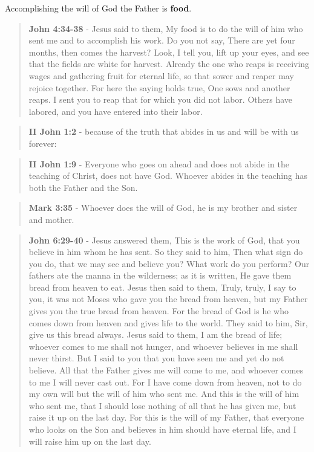 \documentclass[11pt]{article}
\begin{document}
Accomplishing the will of God the Father is \textbf{food}.

\begin{quote}
\textbf{John 4:34-38} - Jesus said to them, My food is to do the will of him who sent me and to accomplish his work. Do you not say, There are yet four months, then comes the harvest? Look, I tell you, lift up your eyes, and see that the fields are white for harvest. Already the one who reaps is receiving wages and gathering fruit for eternal life, so that sower and reaper may rejoice together. For here the saying holds true, One sows and another reaps. I sent you to reap that for which you did not labor. Others have labored, and you have entered into their labor.
\end{quote}

\begin{quote}
\textbf{II John 1:2} - because of the truth that abides in us and will be with us forever:
\end{quote}

\begin{quote}
\textbf{II John 1:9} - Everyone who goes on ahead and does not abide in the teaching of Christ, does not have God. Whoever abides in the teaching has both the Father and the Son.
\end{quote}

\begin{quote}
\textbf{Mark 3:35} - Whoever does the will of God, he is my brother and sister and mother.
\end{quote}

\begin{quote}
\textbf{John 6:29-40} - Jesus answered them, This is the work of God, that you believe in him whom he has sent. So they said to him, Then what sign do you do, that we may see and believe you? What work do you perform? Our fathers ate the manna in the wilderness; as it is written, He gave them bread from heaven to eat. Jesus then said to them, Truly, truly, I say to you, it was not Moses who gave you the bread from heaven, but my Father gives you the true bread from heaven. For the bread of God is he who comes down from heaven and gives life to the world. They said to him, Sir, give us this bread always. Jesus said to them, I am the bread of life; whoever comes to me shall not hunger, and whoever believes in me shall never thirst. But I said to you that you have seen me and yet do not believe. All that the Father gives me will come to me, and whoever comes to me I will never cast out. For I have come down from heaven, not to do my own will but the will of him who sent me. And this is the will of him who sent me, that I should lose nothing of all that he has given me, but raise it up on the last day. For this is the will of my Father, that everyone who looks on the Son and believes in him should have eternal life, and I will raise him up on the last day.
\end{quote}
\end{document}
